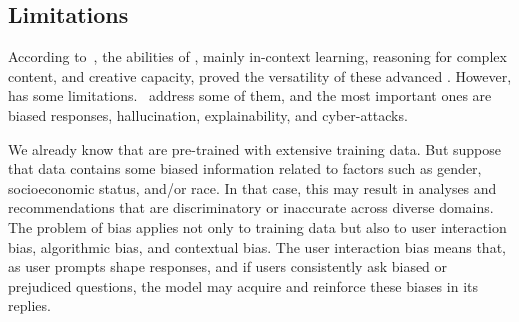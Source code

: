 


\subsection{Limitations}

According to~\citet{liu_prompting_nodate}, the abilities of {\llm}, mainly in-context learning, reasoning for complex content, and creative capacity, proved the versatility of these advanced {\lm}. However, {\llm} has some limitations.~\citet{hadi_LLM_2023} address some of them, and the most important ones are biased responses, hallucination, explainability, and cyber-attacks. 

We already know that {\llm} are pre-trained with extensive training data. But suppose that data contains some biased information related to factors such as gender, socioeconomic status, and/or race. In that case, this may result in analyses and recommendations that are discriminatory or inaccurate across diverse domains. The problem of bias applies not only to training data but also to user interaction bias, algorithmic bias, and contextual bias. The user interaction bias means that, as user prompts shape responses, and if users consistently ask biased or prejudiced questions, the model may acquire and reinforce these biases in its replies.

